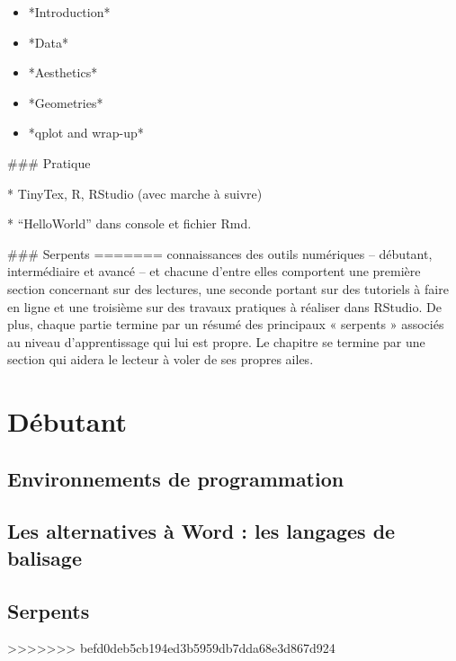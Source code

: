 \documentclass[
  letterpaper,
]{scrbook}
\begin{document}
\begin{itemize}
\item
  *Introduction*
\item
  *Data*
\item
  *Aesthetics*
\item
  *Geometries*
\item
  *qplot and wrap-up*
\end{itemize}

\#\#\# Pratique

* TinyTex, R, RStudio (avec marche à suivre)

* ``HelloWorld'' dans console et fichier Rmd.

\#\#\# Serpents
=======
connaissances des outils numériques -- débutant, intermédiaire et avancé
-- et chacune d'entre elles comportent une première section concernant
sur des lectures, une seconde portant sur des tutoriels à faire en ligne
et une troisième sur des travaux pratiques à réaliser dans RStudio. De
plus, chaque partie termine par un résumé des principaux « serpents »
associés au niveau d'apprentissage qui lui est propre. Le chapitre se
termine par une section qui aidera le lecteur à voler de ses propres
ailes.

\hypertarget{duxe9butant}{%
\section{Débutant}\label{duxe9butant}}

\hypertarget{environnements-de-programmation}{%
\subsection{Environnements de
programmation}\label{environnements-de-programmation}}

\hypertarget{les-alternatives-uxe0-word-les-langages-de-balisage}{%
\subsection{Les alternatives à Word : les langages de
balisage}\label{les-alternatives-uxe0-word-les-langages-de-balisage}}

\hypertarget{serpents}{%
\subsection{Serpents}\label{serpents}}
>>>>>>> befd0deb5cb194ed3b5959db7dda68e3d867d924
\end{document}
